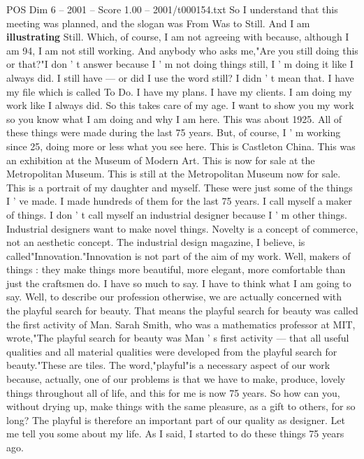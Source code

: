 \begin{textsample}{POS Dim 6 – 2001 – Score 1.00 – 2001/t000154.txt}  \label{ex:f6_pos_025}
So I understand that this meeting was planned, and the slogan was From Was to Still.
And I am \textbf{illustrating} Still.
Which, of course, I am not agreeing with because, although I am 94, I am not still working.
And anybody who asks me,"Are you still doing this or that?"I don ' t answer because I ' m not doing things still, I ' m doing it like I always did.
I still have — or did I use the word still?
I didn ' t mean that.
I have my file which is called To Do.
I have my plans.
I have my clients.
I am doing my work like I always did.
So this takes care of my age.
I want to show you my work so you know what I am doing and why I am here.
This was about 1925.
All of these things were made during the last 75 years.
But, of course, I ' m working since 25, doing more or less what you see here.
This is Castleton China.
This was an exhibition at the Museum of Modern Art.
This is now for sale at the Metropolitan Museum.
This is still at the Metropolitan Museum now for sale.
This is a portrait of my daughter and myself.
These were just some of the things I ' ve made.
I made hundreds of them for the last 75 years.
I call myself a maker of things.
I don ' t call myself an industrial designer because I ' m other things.
Industrial designers want to make novel things.
Novelty is a concept of commerce, not an aesthetic concept.
The industrial design magazine, I believe, is called"Innovation."Innovation is not part of the aim of my work.
Well, makers of things : they make things more beautiful, more elegant, more comfortable than just the craftsmen do.
I have so much to say.
I have to think what I am going to say.
Well, to describe our profession otherwise, we are actually concerned with the playful search for beauty.
That means the playful search for beauty was called the first activity of Man.
Sarah Smith, who was a mathematics professor at MIT, wrote,"The playful search for beauty was Man ' s first activity — that all useful qualities and all material qualities were developed from the playful search for beauty."These are tiles.
The word,"playful"is a necessary aspect of our work because, actually, one of our problems is that we have to make, produce, lovely things throughout all of life, and this for me is now 75 years.
So how can you, without drying up, make things with the same pleasure, as a gift to others, for so long?
The playful is therefore an important part of our quality as designer.
Let me tell you some about my life.
As I said, I started to do these things 75 years ago.

\end{textsample}
